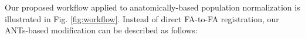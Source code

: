 \documentclass[final,5p,times,twocolumn]{elsarticle}
\begin{document}
%

Our proposed workflow applied to anatomically-based population normalization is illustrated in Fig. \ref{fig:workflow}.  Instead of direct FA-to-FA registration, our ANTs-based modification can be described as follows:
\end{document}
